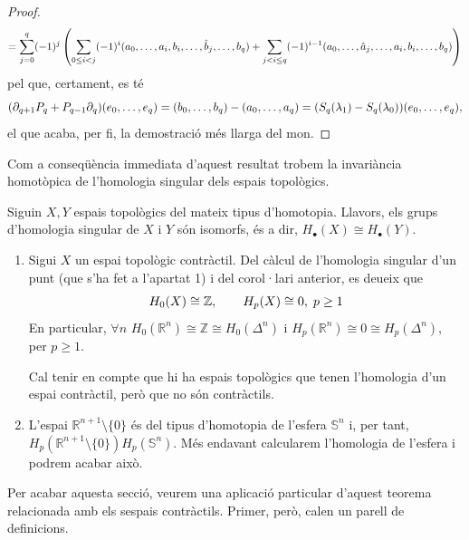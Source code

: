 \documentclass[../main.tex]{subfiles}
\begin{document}
\begin{proof}
\begin{equation}
    \notag
    = \sum_{j=0}^q(-1)^j\left(\sum_{0\leq i<j}(-1)^{i}(a_0,\ldots,a_i,b_i,\ldots,\hat{b}_j,\ldots,b_q) + \sum_{j<i\leq q}(-1)^{i-1}(a_0,\ldots,\hat{a}_j,\ldots,a_i,b_i,\ldots,b_q)\right)    
\end{equation}
pel que, certament, es té
\begin{equation}
    \notag
    (\partial_{q+1}P_q+P_{q-1}\partial_q)(e_0,\ldots,e_q) = (b_0,\ldots,b_q)-(a_0,\ldots,a_q) = (S_q(\lambda_1)-S_q(\lambda_0))(e_0,\ldots,e_q),
\end{equation}
el que acaba, per fi, la demostració més llarga del mon.
\end{proof}

Com a conseqüència immediata d'aquest resultat trobem la invariància homotòpica de l'homologia singular dels espais topològics.

\begin{coro}
Siguin $X,Y$ espais topològics del mateix tipus d'homotopia. Llavors, els grups d'homologia singular de $X$ i $Y$ són isomorfs, és a dir, $H_\bullet(X)\cong H_\bullet(Y)$.
\end{coro}

\begin{ej}
\begin{enumerate}
    \item Sigui $X$ un espai topològic contràctil. Del càlcul de l'homologia singular d'un punt (que s'ha fet a l'apartat 1) i del corol·lari anterior, es deueix que 
    \begin{equation}
        \notag
        H_0(X)\cong\mathbb{Z},\qquad H_p(X)\cong 0,\;p\geq 1
    \end{equation}
    En particular, $\forall n$ $H_0(\mathbb{R}^n)\cong \mathbb{Z}\cong H_0(\Delta^n)$ i $H_p(\mathbb{R}^n)\cong 0\cong H_p(\Delta^n)$, per $p\geq 1$.
    
    Cal tenir en compte que hi ha espais topològics que tenen l'homologia d'un espai contràctil, però que no són contràctils.
    
    \item L'espai $\mathbb{R}^{n+1}\setminus\{0\}$ és del tipus d'homotopia de l'esfera $\mathbb{S}^n$ i, per tant, $H_p(\mathbb{R}^{n+1}\setminus\{0\})H_p(\mathbb{S}^n)$. Més endavant calcularem l'homologia de l'esfera i podrem acabar això.
\end{enumerate}
\end{ej}



Per acabar aquesta secció, veurem una aplicació particular d'aquest teorema relacionada amb els sespais contràctils. Primer, però, calen un parell de definicions.
\end{document}
